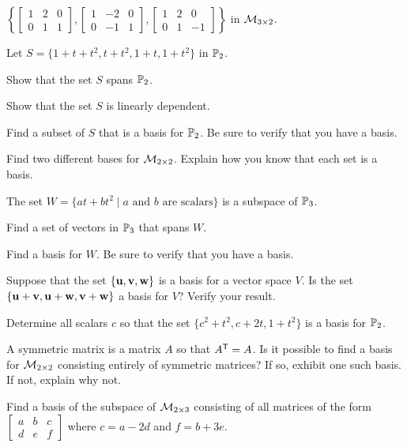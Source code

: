  
	\item $\left\{ \left[ \begin{array}{ccc} 1&2&0\\0&1&1 \end{array} \right], \left[ \begin{array}{crc} 1&-2&0\\0&-1&1 \end{array} \right],
 \left[ \begin{array}{ccr} 1&2&0\\0&1&-1 \end{array} \right] \right\}$ in $\mathcal{M}_{3 \times 2}$. 
	\ea
	
\item Let $S = \{1+t+t^2, t+t^2, 1+t, 1+t^2\}$ in $\mathbb{P}_2$. 
	\ba
	\item Show that the set $S$ spans $\mathbb{P}_2$.
	\item Show that the set $S$ is linearly dependent.
	\item Find a subset of $S$ that is a basis for $\mathbb{P}_2$. Be sure to verify that you have a basis.
	\ea
	
\item Find two different bases for $\mathcal{M}_{2 \times 2}$. Explain how you know that each set is a basis. 

\item The set $W = \{at+bt^2 \mid a \text{ and } b \text{ are scalars}\}$ is a subspace of $\mathbb{P}_3$. 
	\ba
	\item Find a set of vectors in $\mathbb{P}_3$ that spans $W$. 
	\item Find a basis for $W$. Be sure to verify that you have a basis.
	\ea
	
\item Suppose that the set $\{\mathbf{u}, \mathbf{v}, \mathbf{w}\}$ is a basis for a vector space $V$. Is the set $\{\mathbf{u}+\mathbf{v}, \mathbf{u}+\mathbf{w}, \mathbf{v}+\mathbf{w}\}$ a basis for $V$? Verify your result.

\item Determine all scalars $c$ so that the set $\{c^2+t^2, c+2t, 1+t^2\}$ is a basis for $\mathbb{P}_2$.

\item A symmetric matrix is a matrix $A$ so that $A^{\mathsf{T}} = A$. Is it possible to find a basis for $\mathcal{M}_{2 \times 2}$ consisting entirely of symmetric matrices? If so, exhibit one such basis. If not, explain why not. 

\item Find a basis of the subspace of $\mathcal{M}_{2 \times 3}$ consisting of all matrices of the form $\left[ \begin{array}{ccc} a&b&c \\ d&e&f \end{array} \right]$ where $c=a-2d$ and $f = b+3e$. 

